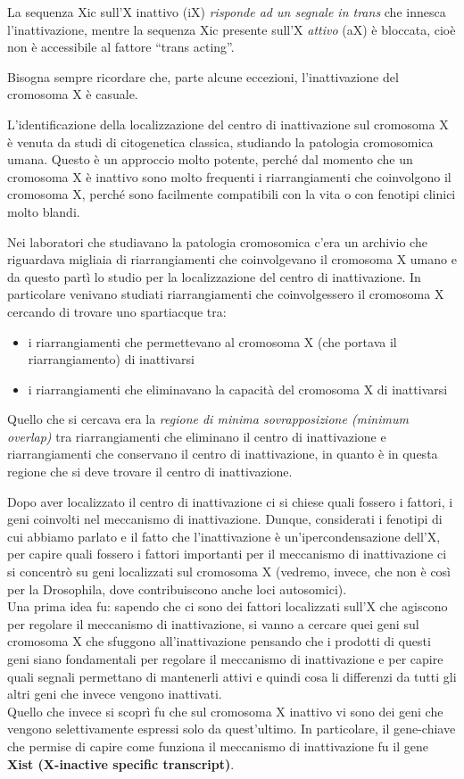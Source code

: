 \documentclass[11pt]{book}
\begin{document}
La sequenza Xic sull’X inattivo (iX) \emph{risponde ad un segnale in trans} che innesca l’inattivazione, mentre la sequenza Xic presente sull’X \emph{attivo} (aX) è bloccata, cioè non è accessibile al fattore ``trans acting''.

Bisogna sempre ricordare che, parte alcune eccezioni, l’inattivazione del cromosoma X è casuale.

L'identificazione della localizzazione del centro di inattivazione sul cromosoma X è venuta da studi di citogenetica classica, studiando la patologia cromosomica umana. Questo è un approccio molto potente, perché dal momento che un cromosoma X è inattivo sono molto frequenti i riarrangiamenti che coinvolgono il cromosoma X, perché sono facilmente compatibili con la vita o con fenotipi clinici molto blandi.

Nei laboratori che studiavano la patologia cromosomica c’era un archivio che riguardava migliaia di riarrangiamenti che coinvolgevano il cromosoma X umano e da questo partì lo studio per la localizzazione del centro di inattivazione. In particolare venivano studiati riarrangiamenti che coinvolgessero il cromosoma X cercando di trovare uno spartiacque tra:
\begin{itemize}
\item i riarrangiamenti che permettevano al cromosoma X (che portava il riarrangiamento) di inattivarsi
\item i riarrangiamenti che eliminavano la capacità del cromosoma X di inattivarsi
\end{itemize}

Quello che si cercava era la \emph{regione di minima sovrapposizione (minimum overlap)} tra riarrangiamenti che eliminano il centro di inattivazione e riarrangiamenti che conservano il centro di inattivazione, in quanto è in questa regione che si deve trovare il centro di inattivazione.

Dopo aver localizzato il centro di inattivazione ci si chiese quali fossero i fattori, i geni coinvolti nel meccanismo di inattivazione.
Dunque, considerati i fenotipi di cui abbiamo parlato e il fatto che l’inattivazione è un’ipercondensazione dell’X, per capire quali fossero i fattori importanti per il meccanismo di inattivazione ci si concentrò su geni localizzati sul cromosoma X (vedremo, invece, che non è così per la Drosophila, dove contribuiscono anche loci autosomici).\\
Una prima idea fu: sapendo che ci sono dei fattori localizzati sull’X che agiscono per regolare il meccanismo di inattivazione, si vanno a cercare quei geni sul cromosoma X che sfuggono all’inattivazione pensando che i prodotti di questi geni siano fondamentali per regolare il meccanismo di inattivazione e per capire quali segnali permettano di mantenerli attivi e quindi cosa li differenzi da tutti gli altri geni che invece vengono inattivati.\\
Quello che invece si scoprì fu che sul cromosoma X inattivo vi sono dei geni che vengono selettivamente espressi solo da quest’ultimo. In particolare, il gene-chiave che permise di capire come funziona il meccanismo di inattivazione fu il gene \textbf{Xist (X-inactive specific transcript)}.
\end{document}

